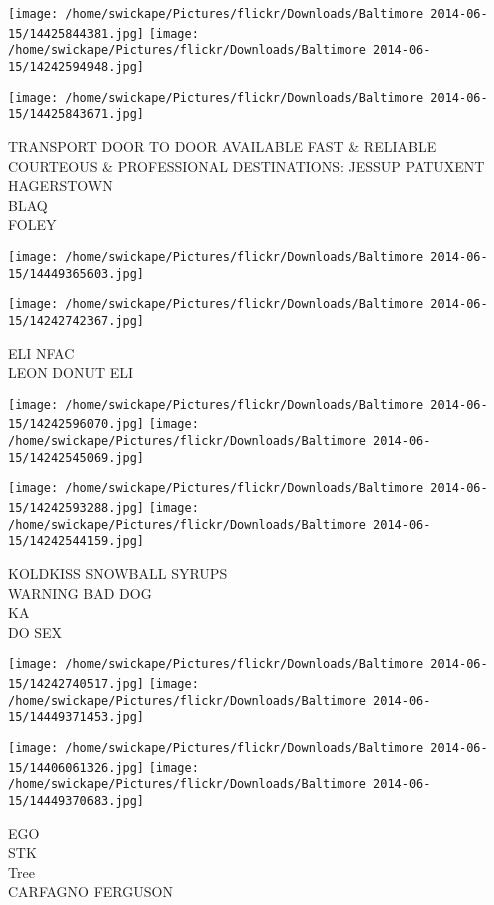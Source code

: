 \documentclass[10pt,letterpaper]{article}
\begin{document}
\texttt{[image: /home/swickape/Pictures/flickr/Downloads/Baltimore 2014-06-15/14425844381.jpg]}
\texttt{[image: /home/swickape/Pictures/flickr/Downloads/Baltimore 2014-06-15/14242594948.jpg]}

\texttt{[image: /home/swickape/Pictures/flickr/Downloads/Baltimore 2014-06-15/14425843671.jpg]}

TRANSPORT DOOR TO DOOR AVAILABLE FAST \& RELIABLE COURTEOUS \& PROFESSIONAL DESTINATIONS: JESSUP PATUXENT HAGERSTOWN\\
BLAQ\\
FOLEY\\
\pagebreak

\texttt{[image: /home/swickape/Pictures/flickr/Downloads/Baltimore 2014-06-15/14449365603.jpg]}

\vspace{0.25in}
\texttt{[image: /home/swickape/Pictures/flickr/Downloads/Baltimore 2014-06-15/14242742367.jpg]}

ELI NFAC\\
LEON DONUT ELI\\
\pagebreak

\texttt{[image: /home/swickape/Pictures/flickr/Downloads/Baltimore 2014-06-15/14242596070.jpg]}
\texttt{[image: /home/swickape/Pictures/flickr/Downloads/Baltimore 2014-06-15/14242545069.jpg]}

\texttt{[image: /home/swickape/Pictures/flickr/Downloads/Baltimore 2014-06-15/14242593288.jpg]}
\texttt{[image: /home/swickape/Pictures/flickr/Downloads/Baltimore 2014-06-15/14242544159.jpg]}

KOLDKISS SNOWBALL SYRUPS\\
WARNING BAD DOG\\
KA\\
DO SEX\\
\pagebreak

\texttt{[image: /home/swickape/Pictures/flickr/Downloads/Baltimore 2014-06-15/14242740517.jpg]}
\texttt{[image: /home/swickape/Pictures/flickr/Downloads/Baltimore 2014-06-15/14449371453.jpg]}

\texttt{[image: /home/swickape/Pictures/flickr/Downloads/Baltimore 2014-06-15/14406061326.jpg]}
\texttt{[image: /home/swickape/Pictures/flickr/Downloads/Baltimore 2014-06-15/14449370683.jpg]}

EGO\\
STK\\
Tree\\
CARFAGNO FERGUSON\\
\pagebreak
\end{document}
